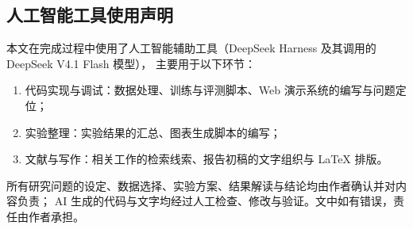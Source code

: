 
\subsection*{人工智能工具使用声明}

本文在完成过程中使用了人工智能辅助工具（DeepSeek Harness 及其调用的 DeepSeek V4.1 Flash 模型），
主要用于以下环节：

\begin{enumerate}
  \item 代码实现与调试：数据处理、训练与评测脚本、Web 演示系统的编写与问题定位；
  \item 实验整理：实验结果的汇总、图表生成脚本的编写；
  \item 文献与写作：相关工作的检索线索、报告初稿的文字组织与 \LaTeX{} 排版。
\end{enumerate}

所有研究问题的设定、数据选择、实验方案、结果解读与结论均由作者确认并对内容负责；
AI 生成的代码与文字均经过人工检查、修改与验证。文中如有错误，责任由作者承担。

